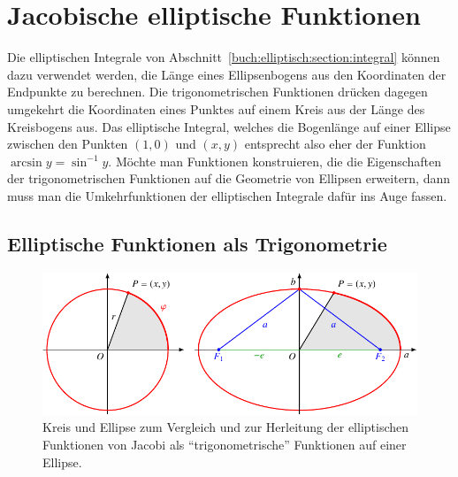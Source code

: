 %
%
%
\section{Jacobische elliptische Funktionen
\label{buch:elliptisch:section:jacobi}}
Die elliptischen Integrale von
Abschnitt~\ref{buch:elliptisch:section:integral}
können dazu verwendet werden, die Länge eines Ellipsenbogens aus
den Koordinaten der Endpunkte zu berechnen.
Die trigonometrischen Funktionen drücken dagegen umgekehrt die
Koordinaten eines Punktes auf einem Kreis aus der Länge des
Kreisbogens aus.
Das elliptische Integral, welches die Bogenlänge auf einer Ellipse zwischen
den Punkten $(1,0)$ und $(x,y)$ entsprecht also eher der Funktion
$\arcsin y=\sin^{-1}y$.
Möchte man Funktionen konstruieren, die die Eigenschaften der 
trigonometrischen Funktionen auf die Geometrie von Ellipsen erweitern,
dann muss man die Umkehrfunktionen der elliptischen Integrale dafür ins
Auge fassen.


\subsection{Elliptische Funktionen als Trigonometrie}
\begin{figure}
\centering
\includegraphics{chapters/110-elliptisch/images/ellipse.pdf}
\caption{Kreis und Ellipse zum Vergleich und zur Herleitung der 
elliptischen Funktionen von Jacobi als ``trigonometrische'' Funktionen
auf einer Ellipse.
\label{buch:elliptisch:fig:ellipse}}
\end{figure}

